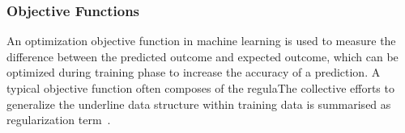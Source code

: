 \subsubsection{Objective Functions}
An optimization objective function in machine learning is used to measure the difference between the predicted outcome and expected outcome, which can be optimized during training phase to increase the accuracy of a prediction. A typical objective function often composes of the regulaThe collective efforts to generalize the underline data structure within training data is summarised as regularization term~\cite{goodfellow_2015}.  